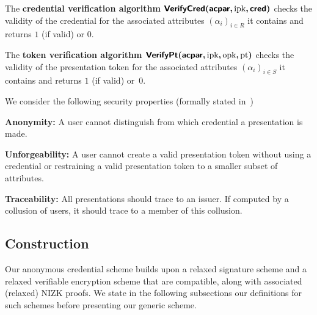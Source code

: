 \begin{compactitem}

\item The \textbf{credential verification algorithm 
$\bm{\mathsf{VerifyCred}(\mathsf{acpar},\allowbreak \text{ipk}, \mathsf{cred})}$} checks the validity of the 
credential for the associated attributes $(\alpha_i)_{i \in R}$ it contains and returns $1$ (if valid) or $0$.

\item The \textbf{token verification algorithm 
$\bm{\mathsf{VerifyPt}(\mathsf{acpar},\allowbreak \text{ipk}, \text{opk}, \text{pt})}$} checks the validity of the 
presentation token for the associated attributes $(\alpha_i)_{i \in S}$ it contains and 
returns $1$ (if valid) or~$0$. \end{compactitem}

We consider the following security properties (formally stated 
in~\cite[Appendix G.1]{ISC:BosCamNev18})

\begin{compactitem}

\item \textbf{Anonymity:} A user cannot distinguish from which credential a 
presentation is made.

\item \textbf{Unforgeability:} A user cannot create a valid presentation 
token without using a credential or restraining a valid presentation 
token to a smaller subset of attributes.

\item \textbf{Traceability:} All presentations should trace to an issuer.
If computed by a collusion of users, it should trace to a member of this 
collusion.

\end{compactitem}




\subsection{Construction}

Our anonymous credential scheme builds upon a relaxed signature scheme and a 
relaxed verifiable encryption scheme that are compatible, along with 
associated (relaxed) NIZK proofs. We state in the following subsections our definitions 
for such schemes before presenting our generic scheme.

